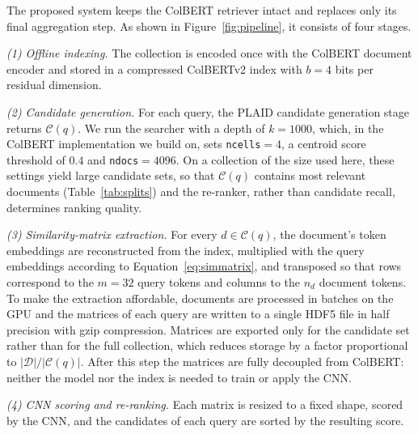 \documentclass[preprint,5p,times,twocolumn,authoryear]{elsarticle}
\begin{document}
The proposed system keeps the ColBERT retriever intact and replaces only its final aggregation step. As shown in Figure~\ref{fig:pipeline}, it consists of four stages.

\textit{(1) Offline indexing.} The collection is encoded once with the ColBERT document encoder and stored in a compressed ColBERTv2 index with $b=4$ bits per residual dimension.

\textit{(2) Candidate generation.} For each query, the PLAID candidate generation stage returns $\mathcal{C}(q)$. We run the searcher with a depth of $k=1000$, which, in the ColBERT implementation we build on, sets \texttt{ncells}$=4$, a centroid score threshold of $0.4$ and \texttt{ndocs}$=4096$. On a collection of the size used here, these settings yield large candidate sets, so that $\mathcal{C}(q)$ contains most relevant documents (Table~\ref{tab:splits}) and the re-ranker, rather than candidate recall, determines ranking quality.

\textit{(3) Similarity-matrix extraction.} For every $d\in\mathcal{C}(q)$, the document's token embeddings are reconstructed from the index, multiplied with the query embeddings according to Equation~\eqref{eq:simmatrix}, and transposed so that rows correspond to the $m=32$ query tokens and columns to the $n_d$ document tokens. To make the extraction affordable, documents are processed in batches on the GPU and the matrices of each query are written to a single HDF5 file in half precision with gzip compression. Matrices are exported only for the candidate set rather than for the full collection, which reduces storage by a factor proportional to $|\mathcal{D}|/|\mathcal{C}(q)|$. After this step the matrices are fully decoupled from ColBERT: neither the model nor the index is needed to train or apply the CNN.

\textit{(4) CNN scoring and re-ranking.} Each matrix is resized to a fixed shape, scored by the CNN, and the candidates of each query are sorted by the resulting score.
\end{document}
